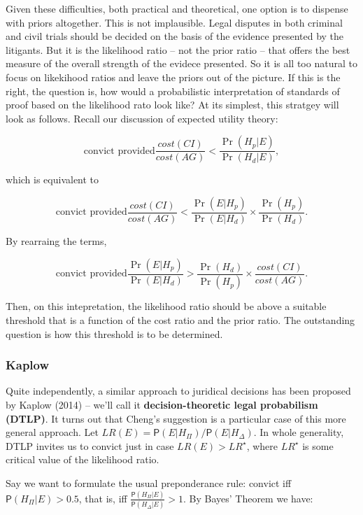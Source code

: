 \documentclass[
  10pt,
  dvipsnames,enabledeprecatedfontcommands]{scrartcl}
\newcommand{\pr}[1]{\mathsf{P}(#1)}
\begin{document}
Given these difficulties, both practical and theoretical, one option is
to dispense with priors altogether. This is not implausible. Legal
disputes in both criminal and civil trials should be decided on the
basis of the evidence presented by the litigants. But it is the
likelihood ratio -- not the prior ratio -- that offers the best measure
of the overall strength of the evidece presented. So it is all too
natural to focus on likekihood ratios and leave the priors out of the
picture. If this is the right, the question is, how would a
probabilistic interpretation of standards of proof based on the
likelihood rato look like? At its simplest, this stratgey will look as
follows. Recall our discussion of expected utility theory:

\[ \text{convict provided}           \frac{cost(CI)}{cost(AG)} < \frac{\Pr(H_p \vert E)}{\Pr(H_d \vert E )}, \]

which is equivalent to

\[ \text{convict provided}           \frac{cost(CI)}{cost(AG)} < \frac{\Pr(E \vert H_p)}{\Pr(E \vert H_d)} \times \frac{\Pr(H_p)}{\Pr(H_d)}.\]

By rearraing the terms,

\[ \text{convict provided}  \frac{\Pr(E \vert H_p)}{\Pr(E \vert H_d)} > \frac{\Pr(H_d)}{\Pr(H_p)} \times     \frac{cost(CI)}{cost(AG)} .\]

Then, on this intepretation, the likelihood ratio should be above a
suitable threshold that is a function of the cost ratio and the prior
ratio. The outstanding question is how this threshold is to be
determined.

\hypertarget{kaplow}{%
\subsubsection{Kaplow}\label{kaplow}}

Quite independently, a similar approach to juridical decisions has been
proposed by Kaplow (2014) -- we'll call it
\textbf{decision-theoretic legal probabilism (DTLP)}. It turns out that
Cheng's suggestion is a particular case of this more general approach.
Let \(LR(E)=\pr{E\vert H_\Pi}/\pr{E\vert H_\Delta}\). In whole
generality, DTLP invites us to convict just in case \(LR(E)>LR^\star\),
where \(LR^\star\) is some critical value of the likelihood ratio.

Say we want to formulate the usual preponderance rule: convict iff
\(\pr{H_\Pi\vert E}>0.5\), that is, iff
\(\frac{\pr{H_\Pi\vert E}}{\pr{H_\Delta\vert E}}>1\). By Bayes' Theorem
we have:
\end{document}
